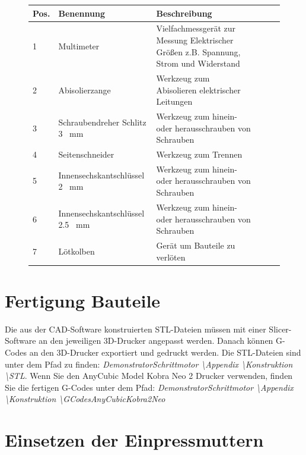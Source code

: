 \begin{figure}[H]
	\begin{center}
		\fontsize{8}{10}\selectfont
		\begin{tabularx}{\textwidth}{|p{0.4cm}|p{3.4cm}|X|X|X|X|} 
			\hline 
			\textbf{Pos.} &  \textbf{Benennung} &  \textbf{Beschreibung}\\ \hline
			1 & Multimeter & Vielfachmessgerät zur Messung Elektrischer Größen z.B. Spannung, Strom und Widerstand  \\ \hline
			2 & Abisolierzange & Werkzeug zum Abisolieren elektrischer Leitungen  \\ \hline
			3 & Schraubendreher Schlitz 3 \ mm & Werkzeug zum hinein- oder herausschrauben von Schrauben \\ \hline
			4 & Seitenschneider & Werkzeug zum Trennen  \\ \hline
			5 & Innensechskantschlüssel 2 \ mm &  Werkzeug zum hinein- oder herausschrauben von Schrauben \\ \hline
			6 & Innensechskantschlüssel 2.5 \ mm &  Werkzeug zum hinein- oder herausschrauben von Schrauben \\ \hline
			7 & Lötkolben &  Gerät um Bauteile zu verlöten \\ \hline

		\end{tabularx}
			\label{WerkTab}
	\end{center}
\end{figure}

\section{Fertigung Bauteile}

Die aus der CAD-Software konstruierten STL-Dateien müssen mit einer Slicer-Software an den jeweiligen 3D-Drucker angepasst werden. Danach können G-Codes an den 3D-Drucker exportiert und gedruckt werden. Die STL-Dateien sind unter dem Pfad zu finden: \emph{DemonstratorSchrittmotor \textbackslash Appendix \textbackslash Konstruktion \textbackslash STL}.  Wenn Sie den AnyCubic Model Kobra Neo 2 Drucker verwenden, finden Sie die fertigen G-Codes unter dem Pfad: \emph{DemonstratorSchrittmotor \textbackslash Appendix \textbackslash Konstruktion \textbackslash GCodesAnyCubicKobra2Neo}

\section{Einsetzen der Einpressmuttern}


